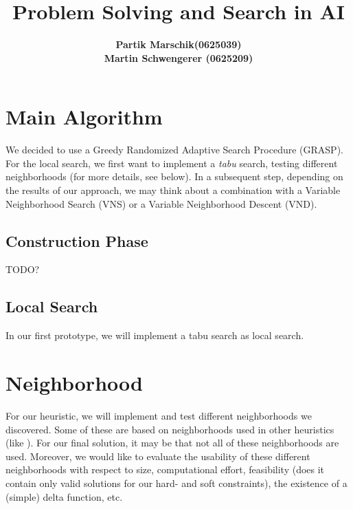 \documentclass[a4paper,11pt]{article}
\title{ \LARGE \bf Problem Solving and Search in AI }
\author{
\bf Partik Marschik(0625039) \\
\bf Martin Schwengerer (0625209) }
\begin{document}
\maketitle

\section{Main Algorithm}
We decided to use a Greedy Randomized Adaptive Search Procedure (GRASP). For the local search, we first want to implement a \emph{tabu} search, testing different neighborhoods (for more details, see below). In a subsequent step, depending on the results of our approach, we may think about a combination with a Variable Neighborhood Search (VNS) or a Variable Neighborhood Descent (VND).



\subsection{Construction Phase}
TODO?
\subsection{Local Search}
In our first prototype, we will implement a tabu search as local search.

\section{Neighborhood}
For our heuristic, we will implement and test different neighborhoods we discovered. Some of these are based on neighborhoods used in other heuristics (like \cite{Gaspero07,rvk2008}).
For our final solution, it may be that not all of these neighborhoods are used. Moreover, we would like to evaluate the usability of these different neighborhoods with respect to size, computational effort, feasibility (does it contain only valid solutions for our hard- and soft constraints), the existence of a (simple) delta function, etc.
\end{document}
